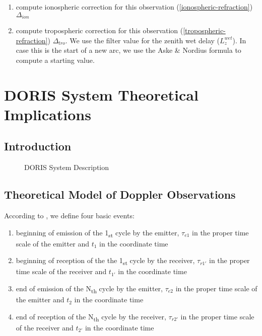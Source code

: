 \begin{enumerate}
\begin{enumerate}
\begin{enumerate}
      \item compute ionospheric correction for this observation 
      (\ref{ionospheric-refraction}) $\Delta _{ion}$

      \item compute tropospheric correction for this observation
      (\ref{tropospheric-refraction}) $\Delta _{tro}$. We use the filter value 
      for the zenith wet delay ($L_{z}^{wet}$). In case this is the start of a 
      new arc, we use the Aske \& Nordius formula to compute a starting value.
    \end{enumerate}

  \end{enumerate}
\end{enumerate}


\chapter{DORIS System Theoretical Implications}
\label{ch:doris-theory}

\section{Introduction}
\label{sec:doris-introduction}

\begin{figure}
\centering

\caption{DORIS System Description}
\label{fig:doris-system-description}
\end{figure}

\section{Theoretical Model of Doppler Observations}
According to \cite{lemoine-2016}, we define four basic events:
\begin{enumerate}
    \item beginning of emission of the 1\textsubscript{st} cycle by the emitter, 
    \(\tau_{e1}\) in the proper time scale of the emitter and \(t_1\) in the coordinate 
    time
    
    \item beginning of reception of the the 1\textsubscript{st} cycle by the receiver, 
    \(\tau_{r1'}\) in the proper time scale of the receiver and 
    \(t_{1'}\) in the coordinate time

    \item end of emission of the N\textsubscript{th} cycle by the emitter, 
    \(\tau_{e2}\) in the proper time scale of the emitter and \(t_2\) in the coordinate 
    time
    
    \item end of reception of the N\textsubscript{th} cycle by the receiver, 
    \(\tau_{r2'}\) in the proper time scale of the receiver and 
    \(t_{2'}\) in the coordinate time
\end{enumerate}

